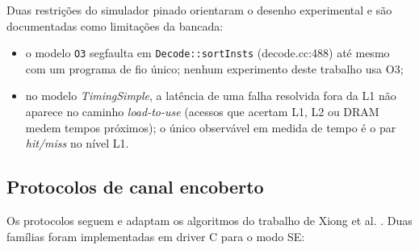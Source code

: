 Duas restrições do simulador pinado orientaram o desenho experimental e são
documentadas como limitações da bancada:

\begin{itemize}
    \item o modelo \texttt{O3} segfaulta em
          \texttt{Decode::sortInsts} (decode.cc:488) até mesmo com um
          programa de fio único; nenhum experimento deste trabalho usa O3;
    \item no modelo \textit{TimingSimple}, a latência de uma falha
          resolvida fora da L1 não aparece no caminho
          \textit{load-to-use} (acessos que acertam L1, L2 ou DRAM medem
          tempos próximos); o único observável em medida de tempo é o par
          \textit{hit/miss} no nível L1.
\end{itemize}

\subsection{Protocolos de canal encoberto}
\label{sub:canal}

Os protocolos seguem e adaptam os algoritmos do trabalho de Xiong et al.
\cite{9354935}. Duas famílias foram implementadas em driver C para o modo
SE:

